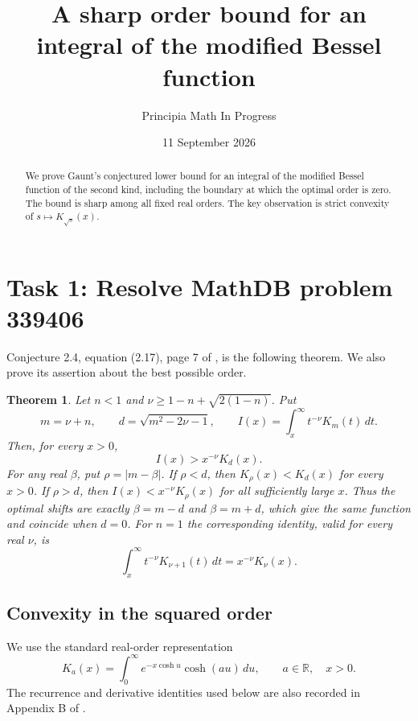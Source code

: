 \documentclass[11pt]{article}
\title{A sharp order bound for an integral of the modified Bessel function}
\author{Principia Math In Progress}
\date{11 September 2026}
\newtheorem{theorem}{Theorem}
\begin{document}
\maketitle
\begin{abstract}
We prove Gaunt's conjectured lower bound for an integral of the modified
Bessel function of the second kind, including the boundary at which the
optimal order is zero. The bound is sharp among all fixed real orders.
The key observation is strict convexity of $s\mapsto K_{\sqrt{s}}(x)$.
\end{abstract}

\section*{Task 1: Resolve MathDB problem 339406}
Conjecture 2.4, equation (2.17), page 7 of \cite{gaunt}, is the following
theorem. We also prove its assertion about the best possible order.

\begin{theorem}\label{thm:main}
Let $n<1$ and $\nu\geq1-n+\sqrt{2(1-n)}$. Put
\[
 m=\nu+n,\qquad d=\sqrt{m^2-2\nu-1},\qquad
 I(x)=\int_x^\infty t^{-\nu}K_m(t)\,dt.
\]
Then, for every $x>0$,
\begin{equation}\label{eq:bound}
 I(x)>x^{-\nu}K_d(x).
\end{equation}
For any real $\beta$, put $\rho=|m-\beta|$. If $\rho<d$, then
$K_\rho(x)<K_d(x)$ for every $x>0$. If $\rho>d$, then
$I(x)<x^{-\nu}K_\rho(x)$ for all sufficiently large $x$.
Thus the optimal shifts are exactly $\beta=m-d$ and $\beta=m+d$,
which give the same function and coincide when $d=0$.
For $n=1$ the corresponding identity, valid for every real $\nu$, is
\begin{equation}\label{eq:equality}
 \int_x^\infty t^{-\nu}K_{\nu+1}(t)\,dt=x^{-\nu}K_\nu(x).
\end{equation}
\end{theorem}

\subsection*{Convexity in the squared order}
We use the standard real-order representation
\begin{equation}\label{eq:representation}
 K_a(x)=\int_0^\infty e^{-x\cosh u}\cosh(au)\,du,
 \qquad a\in\mathbb R,\quad x>0.
\end{equation}
The recurrence and derivative identities used below are also recorded
in Appendix B of \cite{gaunt}.
\end{document}
